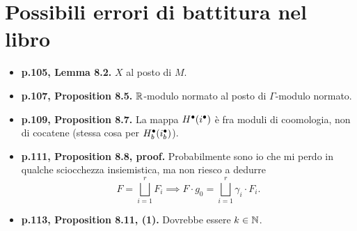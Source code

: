 \section*{Possibili errori di battitura nel libro} 
\begin{itemize}
\item \textbf{p.105, Lemma 8.2.} $X$ al posto di $M$.
\item \textbf{p.107, Proposition 8.5.} $\mathbb{R}$-modulo normato al posto di $\Gamma$-modulo normato.
\item \textbf{p.109, Proposition 8.7.} La mappa $H^\bullet(i^\bullet)$ è fra moduli di coomologia, non di cocatene (stessa cosa per $H^\bullet_b(i^\bullet_b)$).
\item \textbf{p.111, Proposition 8.8, proof.} Probabilmente sono io che mi perdo in qualche sciocchezza insiemistica, ma non riesco a dedurre
\[
F=\bigsqcup_{i=1}^r F_i\implies F\cdot g_0=\bigsqcup_{i=1}^r \gamma_i\cdot F_i.
\]
\item \textbf{p.113, Proposition 8.11, (1).} Dovrebbe essere $k\in\mathbb{N}$.
\end{itemize}